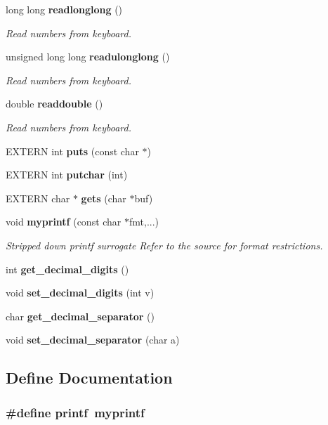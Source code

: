 \begin{CompactItemize}
long long {\bf readlonglong} ()
\begin{CompactList}\small\item\em Read numbers from keyboard.\item\end{CompactList}\item 
unsigned long long {\bf readulonglong} ()
\begin{CompactList}\small\item\em Read numbers from keyboard.\item\end{CompactList}\item 
double {\bf readdouble} ()
\begin{CompactList}\small\item\em Read numbers from keyboard.\item\end{CompactList}\item 
EXTERN int {\bf puts} (const char $\ast$)
\item 
EXTERN int {\bf putchar} (int)
\item 
EXTERN char $\ast$ {\bf gets} (char $\ast$buf)
\item 
void {\bf myprintf} (const char $\ast$fmt,...)
\begin{CompactList}\small\item\em Stripped down printf surrogate Refer to the source for format restrictions.\item\end{CompactList}\item 
int {\bf get\_\-decimal\_\-digits} ()
\item 
void {\bf set\_\-decimal\_\-digits} (int v)
\item 
char {\bf get\_\-decimal\_\-separator} ()
\item 
void {\bf set\_\-decimal\_\-separator} (char a)
\end{CompactItemize}


\subsection{Define Documentation}
\subsubsection{\setlength{\rightskip}{0pt plus 5cm}\#define printf\ myprintf}\label{hpstdio_8h_a0}



